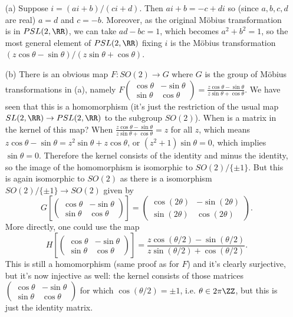 \documentclass[12pt]{article}
\begin{document}
\begin{answer}
  \begin{enumerate}
  \item[(a)] Suppose $i=(ai+b)/(ci+d)$. Then $ai+b=-c+di$ so (since $a,b,c,d$ are real) $a=d$ and $c=-b$. Moreover, as the original M\"obius transformation is in $PSL(2,\RR)$, we can take $ad-bc=1$, which becomes $a^2+b^2=1$, so the most general element of $PSL(2,\RR)$ fixing $i$ is the M\"obius transformation $(z\cos\theta-\sin\theta)/(z\sin\theta+\cos\theta)$.
  \item[(b)] There is an obvious map $F\colon SO(2)\to G$ where $G$ is the group of M\"obius transformations in (a), namely $F\left(\begin{array}{cc}\cos\theta & -\sin\theta\\\sin\theta & \cos\theta\end{array}\right)=\frac{z\cos\theta-\sin\theta}{z\sin\theta+\cos\theta}$. We have seen that this is a homomorphism (it's just the restriction of the usual map $SL(2,\RR)\to PSL(2,\RR)$ to the subgroup $SO(2)$). When is a matrix in the kernel of this map? When $\frac{z\cos\theta-\sin\theta}{z\sin\theta+\cos\theta}=z$ for all $z$, which means $z\cos\theta-\sin\theta=z^2\sin\theta+z\cos\theta$, or $(z^2+1)\sin\theta=0$, which implies $\sin\theta=0$. Therefore the kernel consists of the identity and minus the identity, so the image of the homomorphism is isomorphic to $SO(2)/\{\pm 1\}$. But this is again isomorphic to $SO(2)$ as there is a isomorphism $SO(2)/\{\pm 1\}\to SO(2)$ given by
    \[G\left[\left(\begin{array}{cc}\cos\theta & -\sin\theta\\ \sin\theta & \cos\theta\end{array}\right)\right]=\left(\begin{array}{cc}\cos(2\theta) & -\sin(2\theta)\\ \sin(2\theta) & \cos(2\theta)\end{array}\right).\]
More directly, one could use the map
\[H\left[\left(\begin{array}{cc}\cos\theta & -\sin\theta\\ \sin\theta & \cos\theta\end{array}\right)\right]=\frac{z\cos(\theta/2)-\sin(\theta/2)}{z\sin(\theta/2)+\cos(\theta/2)}.\]
This is still a homomorphism (same proof as for $F$) and it's clearly surjective, but it's now injective as well: the kernel consists of those matrices $\left(\begin{array}{cc}\cos\theta & -\sin\theta\\ \sin\theta & \cos\theta\end{array}\right)$ for which $\cos(\theta/2)=\pm 1$, i.e. $\theta\in 2\pi\ZZ$, but this is just the identity matrix.

\end{enumerate}
\end{answer}
\end{document}
